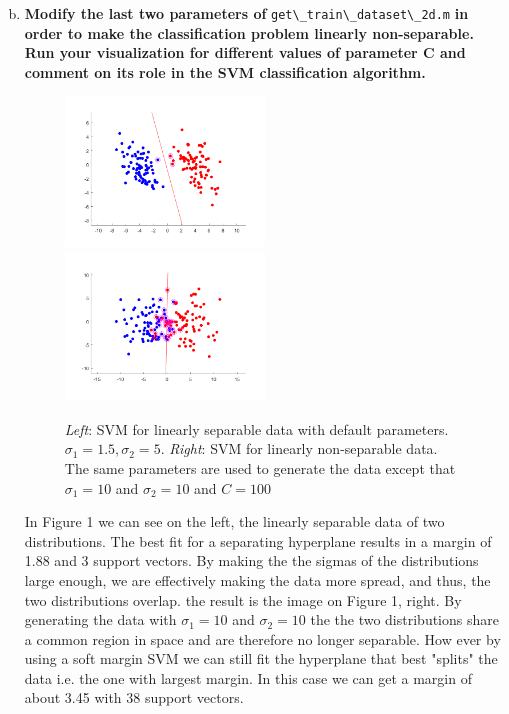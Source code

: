 \documentclass[12pt]{article}
\begin{document}
\begin{enumerate}[a)]
	\setcounter{enumi}{1}
	\item 	
        \textbf{Modify the last two parameters of} \verb!get\_train\_dataset\_2d.m! \textbf{in order to make the classification problem linearly non-separable. Run your visualization for different values of parameter C and comment on its role in the SVM classification algorithm.}\\
        
        	\begin{figure}[h]			
        		\includegraphics[width=0.5\textwidth]{1b_separable}
        		\includegraphics[width=0.5\textwidth]{1b_non-separable}
        		\caption{\textit{Left}: SVM for linearly separable data with default parameters. $ \sigma_1=1.5, \sigma_2=5 $. \textit{Right}: SVM for linearly non-separable data. The same parameters are used to generate the data except that $ \sigma_1=10 $ and $\sigma_2=10 $ and $C=100$ }
        	\end{figure}
        In Figure 1 we can see on the left, the linearly separable data of two distributions. The best fit for a separating hyperplane results in a margin of 1.88 and 3 support vectors. By making the the sigmas of the distributions large enough, we are effectively making the data more spread, and thus, the two distributions overlap. the result is the image on Figure 1, right.  By generating the data with $\sigma_1=10 $ and $\sigma_2=10 $ the the two distributions share a common region in space and are therefore no longer separable. How ever by using a soft margin SVM we can still fit the hyperplane that best "splits" the data i.e. the one with largest margin. In this case we can get a margin of about 3.45 with 38 support vectors.
        

\end{enumerate}
\end{document}
